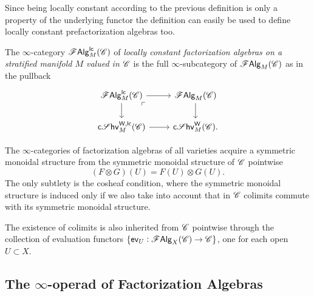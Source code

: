 \documentclass[../text.tex]{subfiles}
\begin{document}
\begin{remark}
    Since being locally constant according to the previous definition is only a property of the underlying functor the definition can easily be used to define locally constant prefactorization algebras too.
\end{remark}

\begin{definition}
    The $\infty$-category $\mathscr{F} \mathsf{Alg}^{\mathsf{lc}}_M (\mathscr{C})$ of \emph{locally constant factorization algebras on a stratified manifold $M$ valued in $\mathscr{C}$} is the full $\infty$-subcategory of $\mathscr{F} \mathsf{Alg}_M (\mathscr{C})$ as in the pullback
    \begin{equation}
        \begin{tikzcd}
            \lcfa_M (\catC) \arrow[dr, phantom, "\ulcorner", very near start] \arrow[r] \arrow[d] & \falg_M (\catC) \arrow[d] \\
            \csheaves[W, lc]_M (\catC) \arrow[r] & \csheaves[W]_M (\catC).
        \end{tikzcd}
    \end{equation}
\end{definition}

\begin{remark}\label{rem:sym_mon_inheritance}
    The $\infty$-categories of factorization algebras of all varieties acquire a symmetric monoidal structure from the symmetric monoidal structure of $\mathscr{C}$ pointwise
    \begin{equation}
        (F \otimes G)(U) = F(U) \otimes G(U).
    \end{equation}
    The only subtlety is the cosheaf condition, where the symmetric monoidal structure is induced only if we also take into account that in $\mathscr{C}$ colimits commute with its symmetric monoidal structure.

    The existence of colimits is also inherited from $\mathscr{C}$ pointwise through the collection of evaluation functors $\{ \mathsf{ev}_U: \mathscr{F} \mathsf{Alg}_X (\mathscr{C}) \rightarrow \mathscr{C} \}$, one for each open $U \subset X$.
\end{remark}



\subsection{The \texorpdfstring{$\infty$-}{infinity-}operad of Factorization Algebras}
\end{document}
